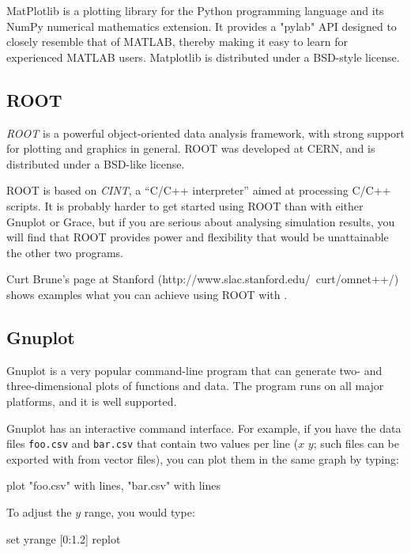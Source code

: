 MatPlotlib is a plotting library for the Python programming language and
its NumPy numerical mathematics extension. It provides a "pylab" API designed
to closely resemble that of MATLAB, thereby making it easy to learn
for experienced MATLAB users. Matplotlib is distributed under a BSD-style
license.


\subsection{ROOT}

\textit{ROOT} is a powerful object-oriented data analysis framework,
with strong support for plotting and graphics in general.
ROOT was developed at CERN, and is distributed under a BSD-like license.

ROOT is based on \textit{CINT}, a ``C/C++ interpreter''
aimed at processing C/C++ scripts. It is probably harder to get started
using ROOT than with either Gnuplot or Grace, but if you are serious
about analysing simulation results, you will find that ROOT provides
power and flexibility that would be unattainable the other two programs.

Curt Brune's page at Stanford (http://www.slac.stanford.edu/~curt/omnet++/)
shows examples what you can achieve using ROOT with {\opp}.


\subsection{Gnuplot}
\label{sec:ana-sim:gnuplot}

Gnuplot is a very popular command-line program that can generate two-
and three-dimensional plots of functions and data. The program runs
on all major platforms, and it is well supported.

Gnuplot has an interactive command interface. For example, if you have
the data files \texttt{foo.csv} and \texttt{bar.csv} that contain
two values per line ($x$ $y$; such files can be exported with
 from vector files), you can plot them in the same
graph by typing:

\begin{commandline}
plot "foo.csv" with lines, "bar.csv" with lines
\end{commandline}

To adjust the $y$ range, you would type:

\begin{commandline}
set yrange [0:1.2]
replot
\end{commandline}

